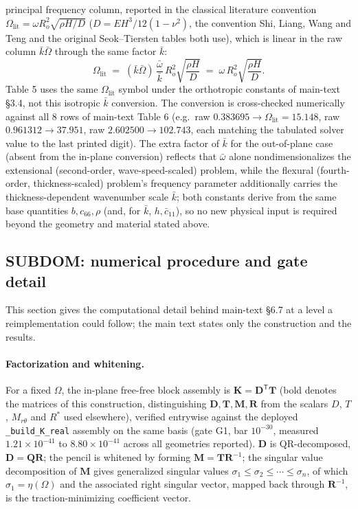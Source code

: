 \documentclass[11pt]{article}
\begin{document}
principal frequency column, reported in the classical literature
convention
$\Omega_{\mathrm{lit}}=\omega R_o^2\sqrt{\rho H/D}$
($D=EH^3/12(1-\nu^2)$, the convention Shi, Liang, Wang and Teng and the
original Seok--Tiersten tables both use), which is linear in the raw
column $\bar k\bar\Omega$ through the same factor $\bar k$:
\[
\Omega_{\mathrm{lit}} \;=\; (\bar k\bar\Omega)\,\frac{\bar\omega}{\bar k}\,R_o^2\sqrt{\frac{\rho H}{D}}
\;=\; \omega\,R_o^2\sqrt{\frac{\rho H}{D}}.
\]
Table 5 uses the same $\Omega_{\mathrm{lit}}$ symbol under the
orthotropic constants of main-text \S3.4, not this isotropic $\bar k$
conversion.
The conversion is cross-checked numerically against all 8 rows of
main-text Table 6 (e.g.\ raw $0.383695\to\Omega_{\mathrm{lit}}=15.148$,
raw $0.961312\to37.951$, raw $2.602500\to102.743$, each matching the
tabulated solver value to the last printed digit). The extra factor of
$\bar k$ for the out-of-plane case (absent from the in-plane conversion)
reflects that $\bar\omega$ alone nondimensionalizes the extensional
(second-order, wave-speed-scaled) problem, while the flexural
(fourth-order, thickness-scaled) problem's frequency parameter
additionally carries the thickness-dependent wavenumber scale $\bar k$;
both constants derive from the same base quantities $b,c_{66},\rho$
(and, for $\bar k$, $h,\bar c_{11}$), so no new physical input is
required beyond the geometry and material stated above.

\subsection{SUBDOM: numerical procedure and gate detail}\label{sec:subdom-detail}
This section gives the computational detail behind main-text \S6.7 at a
level a reimplementation could follow; the main text states only the
construction and the results.

\paragraph{Factorization and whitening.} For a fixed $\Omega$, the
in-plane free-free block assembly is $\mathbf{K}=\mathbf{D}^{\mathsf T}\mathbf{T}$
(bold denotes the matrices of this construction, distinguishing
$\mathbf{D},\mathbf{T},\mathbf{M},\mathbf{R}$ from the scalars $D$, $T$,
$M_{r\theta}$ and $R^{*}$ used elsewhere), verified
entrywise against the deployed \texttt{\_build\_K\_real} assembly on the
same basis (gate G1, bar $10^{-30}$, measured $1.21\times10^{-41}$ to
$8.80\times10^{-41}$ across all geometries reported). $\mathbf{D}$ is
QR-decomposed, $\mathbf{D}=\mathbf{Q}\mathbf{R}$; the pencil is whitened by
forming $\mathbf{M}=\mathbf{T}\mathbf{R}^{-1}$; the
singular value decomposition of $\mathbf{M}$ gives generalized singular values
$\sigma_1\le\sigma_2\le\cdots\le\sigma_n$, of which $\sigma_1=\eta(\Omega)$
and the associated right singular vector, mapped back through $\mathbf{R}^{-1}$,
is the traction-minimizing coefficient vector.
\end{document}
